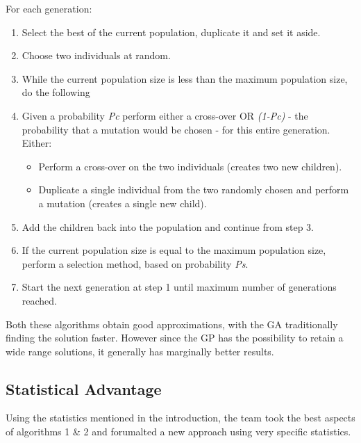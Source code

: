 \documentclass[a4paper,12pt]{article}
\begin{document}
For each generation:
\begin{enumerate}
\item Select the best of the current population, duplicate it and set it aside.
\item Choose two individuals at random.
\item While the current population size is less than the maximum population size, do the following
\item Given a probability \textit{Pc} perform either a cross-over OR \textit{(1-Pc)} - the probability that a mutation would be chosen - for this entire generation. Either:
\begin{itemize}
	\item Perform a cross-over on the two individuals (creates two new children).
	\item Duplicate a single individual from the two randomly chosen and perform a mutation (creates a single new child).
\end{itemize}
\item Add the children back into the population and continue from step 3.
\item If the current population size is equal to the maximum population size, perform a selection method, based on probability \textit{Ps}.
\item Start the next generation at step 1 until maximum number of generations reached.\\
\end{enumerate}

Both these algorithms obtain good approximations, with the GA traditionally finding the solution faster. However since the GP has the possibility to retain a wide range solutions, it generally has marginally better results.

\newpage
\subsection{Statistical Advantage}
Using the statistics mentioned in the introduction, the team took the best aspects of algorithms 1 \& 2 and forumalted a new approach using very specific statistics.
\end{document}
